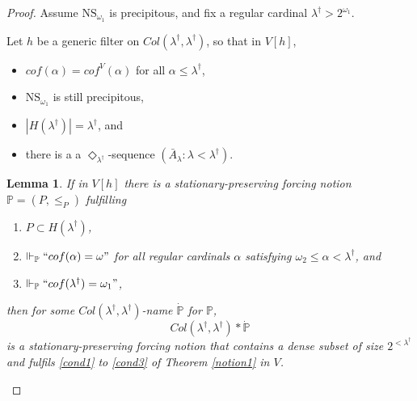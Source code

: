 \documentclass[12pt, twoside]{memoir}
\numberwithin{equation}{section}
\newtheorem{lem}[thm]{Lemma}
\theoremstyle{definition}
\theoremstyle{remark}
\theoremstyle{definition}
\theoremstyle{definition}
\theoremstyle{definition}
\theoremstyle{remark}
\begin{document}
\begin{proof}
Assume $\mathrm{NS}_{\omega_1}$ is precipitous, and fix a regular cardinal $\lambda^{\dagger} > 2^{\omega_1}$.  

Let $h$ be a generic filter on $Col(\lambda^{\dagger}, \lambda^{\dagger})$, so that in $V[h]$, 
\begin{itemize}
    \item $cof(\alpha) = cof^{V}(\alpha)$ for all $ \alpha \leq \lambda^{\dagger}$,
    \item $\mathrm{NS}_{\omega_1}$ is still precipitous,
    \item $|H(\lambda^{\dagger})| = \lambda^{\dagger}$, and
    \item there is a a $\Diamond_{\lambda^{\dagger}}$-sequence $(\bar{A}_{\lambda} : \lambda < \lambda^{\dagger})$.
\end{itemize}

\begin{lem}\label{lem26}
If in $V[h]$ there is a stationary-preserving forcing notion $\mathbb{P} = (P, \leq_P)$ fulfilling 
\begin{enumerate}[label=(\arabic*')]
    \item\label{4100} $P \subset H(\lambda^{\dagger})$, 
    \item\label{4101} $\Vdash_{\mathbb{P}} ``cof(\alpha) = \omega"$ for all regular cardinals $\alpha$ satisfying $\omega_2 \leq \alpha < \lambda^{\dagger}$, and
    \item\label{4102} $\Vdash_{\mathbb{P}} ``cof(\lambda^{\dagger}) = \omega_1"$,
\end{enumerate}
then for some $Col(\lambda^{\dagger}, \lambda^{\dagger})$-name $\dot{\mathbb{P}}$ for $\mathbb{P}$,
\begin{equation*}
    Col(\lambda^{\dagger}, \lambda^{\dagger}) * \dot{\mathbb{P}}
\end{equation*} 
is a stationary-preserving forcing notion that contains a dense subset of size $2^{< \lambda^{\dagger}}$ and fulfils \ref{cond1} to \ref{cond3} of Theorem \ref{notion1} in $V$.
\end{lem}


\end{proof}
\end{document}
